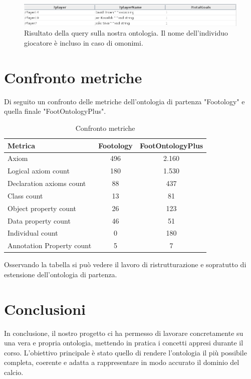 \documentclass[11pt]{report} %
\begin{document}
\begin{itemize}[leftmargin=*]
\begin{figure}[H]
	\includegraphics[width=\textwidth]{query5}
	\caption{Risultato della query sulla nostra ontologia. Il nome dell'individuo giocatore è incluso in caso di omonimi.}
\end{figure}

\chapter{Confronto metriche}

Di seguito un confronto delle metriche dell'ontologia di partenza "Footology" e quella finale "FootOntologyPlus".

\hfill

\begin{table}[h!]
\centering
\begin{tabular}{|l|c|c|}
\hline
\textbf{Metrica} & \textbf{Footology} & \textbf{FootOntologyPlus} \\
\hline
Axiom & 496 & 2.160 \\
Logical axiom count & 180 & 1.530 \\
Declaration axioms count & 88 & 437 \\
Class count & 13 & 81 \\
Object property count & 26 & 123 \\
Data property count & 46 & 51 \\
Individual count & 0 & 180 \\
Annotation Property count & 5 & 7 \\
\hline
\end{tabular}
\caption{Confronto metriche}
\end{table}

\hfill

Osservando la tabella si può vedere il lavoro di ristrutturazione e sopratutto di estensione dell'ontologia di partenza.


\chapter{Conclusioni}

In conclusione, il nostro progetto ci ha permesso di lavorare concretamente su una vera e propria ontologia, mettendo in pratica i concetti appresi durante il corso. L’obiettivo principale è stato quello di rendere l’ontologia il più possibile completa, coerente e adatta a rappresentare in modo accurato il dominio del calcio.


\end{itemize}
\end{document}
